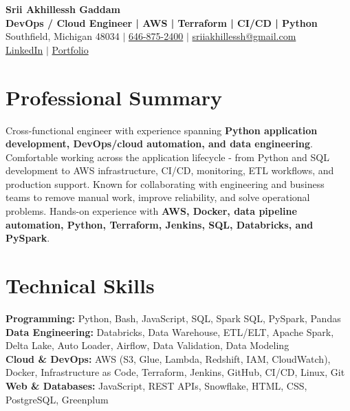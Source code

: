 \documentclass[letterpaper,10pt]{article}
\begin{document}
\fontsize{9.35pt}{10.45pt}\selectfont

\begin{center}
    {\LARGE \textbf{Srii Akhillessh Gaddam}} \\[-1pt]
    \textbf{DevOps / Cloud Engineer | AWS | Terraform | CI/CD | Python} \\[2pt]
    Southfield, Michigan 48034 $|$
    \href{tel:6468752400}{646-875-2400} $|$
    \href{mailto:sriiakhillessh@gmail.com}{sriiakhillessh@gmail.com} \\[1pt]
    \href{https://www.linkedin.com/in/srii-akhiilessh-gaddam-b48668191/}{LinkedIn} $|$
    \href{https://sriiakhillesshg.github.io/portfolio/}{Portfolio}
\end{center}
\vspace{-8pt}

\section{Professional Summary}
\small{Cross-functional engineer with experience spanning \textbf{Python application development, DevOps/cloud automation, and data engineering}. Comfortable working across the application lifecycle - from Python and SQL development to AWS infrastructure, CI/CD, monitoring, ETL workflows, and production support. Known for collaborating with engineering and business teams to remove manual work, improve reliability, and solve operational problems. Hands-on experience with \textbf{AWS, Docker, data pipeline automation, Python, Terraform, Jenkins, SQL, Databricks, and PySpark}.}

\section{Technical Skills}
\small{
\textbf{Programming:} Python, Bash, JavaScript, SQL, Spark SQL, PySpark, Pandas \\
\textbf{Data Engineering:} Databricks, Data Warehouse, ETL/ELT, Apache Spark, Delta Lake, Auto Loader, Airflow, Data Validation, Data Modeling \\
\textbf{Cloud \& DevOps:} AWS (S3, Glue, Lambda, Redshift, IAM, CloudWatch), Docker, Infrastructure as Code, Terraform, Jenkins, GitHub, CI/CD, Linux, Git \\
\textbf{Web \& Databases:} JavaScript, REST APIs, Snowflake, HTML, CSS, PostgreSQL, Greenplum
}
\end{document}
